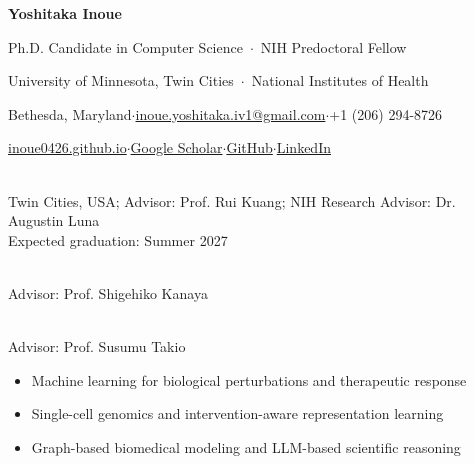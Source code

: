 \documentclass[11pt]{article}
\makeatletter
\def\name{Yoshitaka Inoue}
\def\position{Ph.D. Candidate in Computer Science \,$\cdot$\, NIH Predoctoral Fellow}
\def\affiliation{University of Minnesota, Twin Cities \,$\cdot$\, National Institutes of Health}
\def\address{Bethesda, Maryland}
\def\email{\href{mailto:inoue.yoshitaka.iv1@gmail.com}{inoue.yoshitaka.iv1@gmail.com}}
\def\website{\href{https://inoue0426.github.io/}{inoue0426.github.io}}
\def\phone{+1 (206) 294-8726}
\def\scholar{\href{https://scholar.google.co.jp/citations?user=aBizyLkAAAAJ\&hl=en}{Google Scholar}}
\def\github{\href{https://github.com/inoue0426}{GitHub}}
\def\linkedin{\href{https://www.linkedin.com/in/inoue0426/}{LinkedIn}}
\makeatother
\begin{document}
\begin{center}
    {\huge\textbf{\name}}\par
    \vspace{0.15em}
    {\normalsize\position}\par
    \vspace{0.12em}
    {\small\color{CvMuted}\affiliation}\par
    \vspace{0.25em}
    {\small \address\enspace$\cdot$\enspace\email\enspace$\cdot$\enspace\phone}\par
    \vspace{0.12em}
    {\small \website\enspace$\cdot$\enspace\scholar\enspace$\cdot$\enspace\github\enspace$\cdot$\enspace\linkedin}
\end{center}

\begin{itemize}[leftmargin=*]
    \\
    Twin Cities, USA; Advisor: Prof. Rui Kuang; NIH Research Advisor: Dr. Augustin Luna\\
    Expected graduation: Summer 2027
    
    \\
    Advisor: Prof. Shigehiko Kanaya
    
    \\
    Advisor: Prof. Susumu Takio
\end{itemize}

\begin{itemize}[leftmargin=2em]
    \item Machine learning for biological perturbations and therapeutic response
    \item Single-cell genomics and intervention-aware representation learning
    \item Graph-based biomedical modeling and LLM-based scientific reasoning
\end{itemize}
\end{document}
